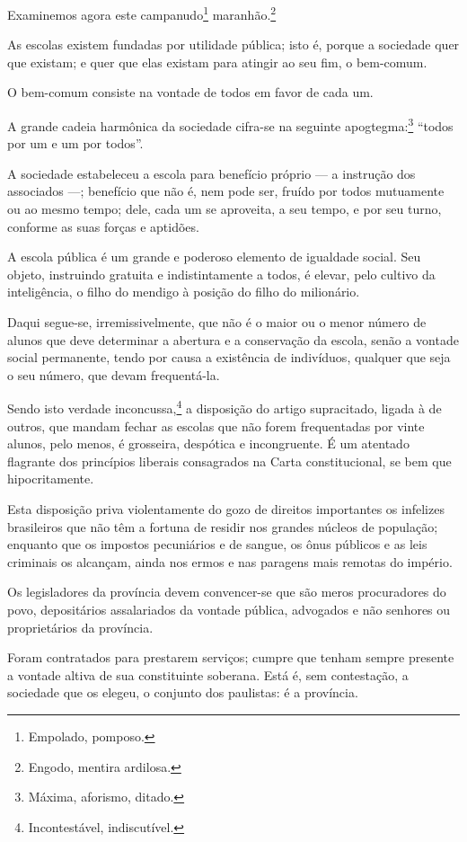 Examinemos agora este campanudo\footnote{Empolado, pomposo.}
maranhão.\footnote{Engodo, mentira ardilosa.}

As escolas existem fundadas por utilidade pública; isto é, porque a
sociedade quer que existam; e quer que elas existam para atingir ao seu
fim, o bem-comum.

O bem-comum consiste na vontade de todos em favor de cada um.

A grande cadeia harmônica da sociedade cifra-se na seguinte
apogtegma:\footnote{Máxima, aforismo, ditado.} ``todos por um e um por
todos''.

A sociedade estabeleceu a escola para benefício próprio --- a instrução
dos associados ---; benefício que não é, nem pode ser, fruído por todos
mutuamente ou ao mesmo tempo; dele, cada um se aproveita, a seu tempo, e
por seu turno, conforme as suas forças e aptidões.

A escola pública é um grande e poderoso elemento de igualdade social.
Seu objeto, instruindo gratuita e indistintamente a todos, é elevar,
pelo cultivo da inteligência, o filho do mendigo à posição do filho do
milionário.

Daqui segue-se, irremissivelmente, que não é o maior ou o menor número
de alunos que deve determinar a abertura e a conservação da escola,
senão a vontade social permanente, tendo por causa a existência de
indivíduos, qualquer que seja o seu número, que devam frequentá-la.

Sendo isto verdade inconcussa,\footnote{Incontestável, indiscutível.}
a disposição do artigo supracitado, ligada à de outros, que mandam
fechar as escolas que não forem frequentadas por vinte alunos, pelo
menos, é grosseira, despótica e incongruente. É um atentado flagrante
dos princípios liberais consagrados na Carta constitucional, se bem que
hipocritamente.

Esta disposição priva violentamente do gozo de direitos importantes os
infelizes brasileiros que não têm a fortuna de residir nos grandes
núcleos de população; enquanto que os impostos pecuniários e de sangue,
os ônus públicos e as leis criminais os alcançam, ainda nos ermos e nas
paragens mais remotas do império.

Os legisladores da província devem convencer-se que são meros
procuradores do povo, depositários assalariados da vontade pública,
advogados e não senhores ou proprietários da província.

Foram contratados para prestarem serviços; cumpre que tenham sempre
presente a vontade altiva de sua constituinte soberana. Está é, sem
contestação, a sociedade que os elegeu, o conjunto dos paulistas: é a
província.

